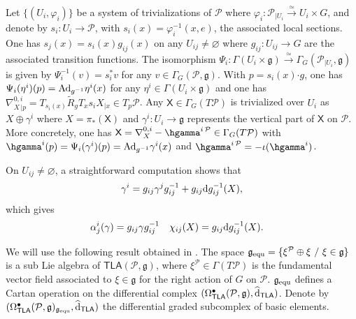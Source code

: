 \documentclass[number]{elsarticle}
\theoremstyle{definition}
\theoremstyle{remark}
\numberwithin{equation}{section}
\begin{document}
Let $\{(U_i, \varphi_i)\}$ be a system of trivializations of ${{{{\mathcal{{P}}}}}}$ where $\varphi_i : {{{{\mathcal{{P}}}}}}_{|U_i} \xrightarrow{\simeq} U_i \times G$, and denote by $s_i : U_i \rightarrow {{{{\mathcal{{P}}}}}}$, with $s_i(x) = \varphi_i^{-1}(x,e)$, the associated local sections. One has $s_j(x) = s_i(x) g_{ij}(x)$ on any $U_{ij} \neq {{\varnothing}}$ where $g_{ij} : U_{ij} \rightarrow G$ are the associated transition functions. The isomorphism $\Psi_i : \Gamma(U_i \times {{\mathfrak g}}) \xrightarrow{\simeq} \Gamma_G({{{{\mathcal{{P}}}}}}_{|U_i},{{\mathfrak g}})$ is given by $\Psi_i^{-1}(v) = s_i^\ast v$ for any $v \in \Gamma_G({{{{\mathcal{{P}}}}}}, {{\mathfrak g}})$. With $p=s_i(x){\mathord{\cdot}} g$, one has $\Psi_i(\eta^i)(p) = {{\text{\textup{Ad}}}}_{g^{-1}} \eta^i(x)$ for any $\eta^i \in \Gamma(U_i \times {{\mathfrak g}})$ and one has $\nabla^{0, i}_{X\,|p} = T_{s_i(x)} {{\widetilde{R}}}_{g} T_x s_i X_{| x} \in T_p {{{{\mathcal{{P}}}}}}$. Any ${{\mathsf X}} \in \Gamma_G(T{{{{\mathcal{{P}}}}}})$ is trivialized over $U_i$ as $X\oplus \gamma^i$ where $X = \pi_\ast({{\mathsf X}})$ and $\gamma^i : U_i \rightarrow {{\mathfrak g}}$ represents the vertical part of ${{\mathsf X}}$ on ${{{{\mathcal{{P}}}}}}$. More concretely, one has ${{\mathsf X}} = \nabla^{0, i}_{X} - \hgamma^{i\,{{{{\mathcal{{P}}}}}}} \in \Gamma_G(T{{{{\mathcal{{P}}}}}})$ with $\hgamma^i(p) = \Psi_i(\gamma^i)(p) = {{\text{\textup{Ad}}}}_{g^{-1}} \gamma^i(x)$ and $\hgamma^{i\,{{{{\mathcal{{P}}}}}}} = -\iota (\hgamma^i)$. 

On $U_{ij} \neq {{\varnothing}}$, a straightforward computation shows that
\begin{equation}
\label{eq-recollementgammai}
\gamma^i = g_{ij} \gamma^j g_{ij}^{-1} + g_{ij} {\text{\textup{d}}} g_{ij}^{-1}(X),
\end{equation}
which gives
\begin{align}
\label{eq-alphachiatiyah}
\alpha_{j}^{i}(\gamma) &= g_{ij} \gamma g_{ij}^{-1}
&
\chi_{ij}(X) &= g_{ij} {\text{\textup{d}}} g_{ij}^{-1}(X).
\end{align}

We will use the following result obtained in \cite{Mass38}. The space ${{\mathfrak g}}_{{\text{\textup{equ}}}} = \{ \xi^{{{{\mathcal{{P}}}}}} \oplus \xi \ / \ \xi \in {{\mathfrak g}} \}$ is a sub Lie algebra of ${{{{\mathbf{\mathsf{{TLA}}}}}}}({{{{\mathcal{{P}}}}}}, {{\mathfrak g}})$, where $\xi^{{{{\mathcal{{P}}}}}} \in \Gamma(T{{{{\mathcal{{P}}}}}})$ is the fundamental vector field associated to $\xi \in {{\mathfrak g}}$ for the right action of $G$ on ${{{{\mathcal{{P}}}}}}$. ${{\mathfrak g}}_{{\text{\textup{equ}}}}$ defines a Cartan operation on the differential complex $(\Omega^{\bullet}_{{{{\mathbf{\mathsf{{TLA}}}}}}}({{{{\mathcal{{P}}}}}},{{\mathfrak g}}), {\widehat{\text{\textup{d}}}}_{{{{\mathbf{\mathsf{{TLA}}}}}}})$. Denote by $(\Omega^{\bullet}_{{{{\mathbf{\mathsf{{TLA}}}}}}}({{{{\mathcal{{P}}}}}},{{\mathfrak g}})_{{{\mathfrak g}}_{{\text{\textup{equ}}}}}, {\widehat{\text{\textup{d}}}}_{{{{\mathbf{\mathsf{{TLA}}}}}}})$ the differential graded subcomplex of basic elements. 
\end{document}
